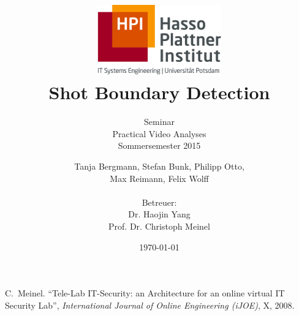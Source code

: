 \documentclass[a4paper,12pt,pagesize,headsepline,bibtotoc,titlepage]{scrartcl}
\title{
	\includegraphics*[width=0.4\textwidth]{images/hpi_logo.png}\\
	\vspace{24pt}
	Shot Boundary Detection
}
\subtitle{
	Seminar\\
	Practical Video Analyses\\
	Sommersemester 2015
}
\author{
	Tanja Bergmann, Stefan Bunk, Philipp Otto, \\
	Max Reimann, Felix Wolff\\ \\[12pt]
	Betreuer:\\
	Dr. Haojin Yang\\
	Prof. Dr. Christoph Meinel
}
\date{\today}
\begin{document}
\maketitle
\tableofcontents
\newpage








\newpage
\begin{thebibliography}{1}

C.~Meinel.
``Tele-Lab IT-Security: an Architecture for an online virtual IT Security Lab'',
\emph{International Journal of Online Engineering (iJOE)},
X, 2008.

\end{thebibliography}
\end{document}
